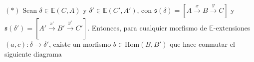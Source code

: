 \documentclass[preview]{standalone}
\begin{document}
\begin{center}
\justifying $(\ast)$ Sean $\delta\in\mathbb{E}(C,A)$ y $\delta'\in\mathbb{E}(C',A')$, con $\mathfrak{s}(\delta) = [A\xrightarrow{x} B\xrightarrow{y} C]$ y $\mathfrak{s}(\delta') = [A'\xrightarrow{x'} B'\xrightarrow{y'} C']$. Entonces, para cualquier morfismo de $\mathbb{E}$-extensiones $(a,c):\delta\to\delta'$, existe un morfismo $b\in\text{Hom}(B,B')$ que hace conmutar el siguiente diagrama
\end{center}
\end{document}
